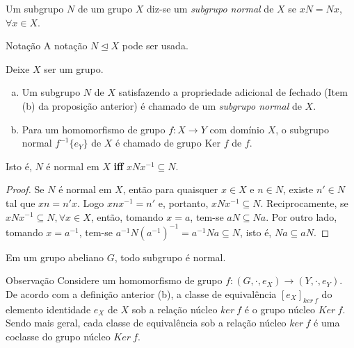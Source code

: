 \begin{definition}
  Um subgrupo $N$ de um grupo $X$ diz-se um \emph{subgrupo normal} de $X$ se $xN = Nx$, $\forall x \in X$.
  \begin{mymdframed}{Notação}
    A notação $N \trianglelefteq X$ pode ser usada.
  \end{mymdframed}
  Deixe $X$ ser um grupo.
  \begin{enumerate}[(a)]
    \item Um subgrupo $N$ de $X$ satisfazendo a propriedade adicional de fechado (Item (b) da proposição anterior) é chamado de um \emph{subgrupo normal} de $X$.
    \item Para um homomorfismo de grupo $f: X\to Y$ com domínio $X$, o subgrupo normal $f^{-1}\{e_{Y}\}$ de $X$ é chamado de grupo Ker $f$ de $f$.
  \end{enumerate}
Isto é, $N$ é normal em $X$ \textbf{iff} $xNx^{-1} \subseteq N$. 
\begin{proof}
  Se $N$ é normal em $X$, então para quaisquer $x \in X$ e $n \in N$, existe $n' \in N$ tal que $xn = n'x$. Logo $xnx^{-1} = n'$ e, portanto, $xNx^{-1} \subseteq N$.
  Reciprocamente, se $xNx^{-1} \subseteq N, \forall x \in X$, então, tomando $x = a$, tem-se $aN \subseteq Na$. Por outro lado, tomando $x = a^{-1}$, tem-se $a^{-1}N(a^{-1})^{-1} = a^{-1}Na \subseteq N$, isto é, $Na \subseteq aN$.
\end{proof}


\end{definition}
\begin{stat}
  Em um grupo abeliano $G$, todo subgrupo é normal.
\end{stat}
\begin{mymdframed}{Observação}
  Considere um homomorfismo de grupo $f: (G,\cdot,e_{X}) \to (Y,\cdot,e_{Y})$. De acordo com a definição anterior (b), a classe de equivalência $[e_{X}]_{ker\ f}$ do elemento identidade $e_{X}$ de $X$ sob a relação núcleo $ker\ f$ é o grupo núcleo $Ker\ f$. Sendo mais geral, cada classe de equivalência sob a relação núcleo $ker\ f$ é uma coclasse do grupo núcleo $Ker\ f$.
\end{mymdframed}
